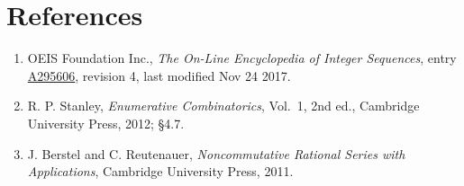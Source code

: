 \documentclass[11pt]{article}
\theoremstyle{definition}
\begin{document}
\section{References}

\begin{enumerate}

\item OEIS Foundation Inc., \emph{The On-Line Encyclopedia of Integer Sequences}, entry \href{https://oeis.org/A295606}{A295606}, revision 4, last modified Nov 24 2017.

\item R. P. Stanley, \emph{Enumerative Combinatorics}, Vol.~1, 2nd ed., Cambridge University Press, 2012; \S4.7.

\item J. Berstel and C. Reutenauer, \emph{Noncommutative Rational Series with Applications}, Cambridge University Press, 2011.

\end{enumerate}
\end{document}
